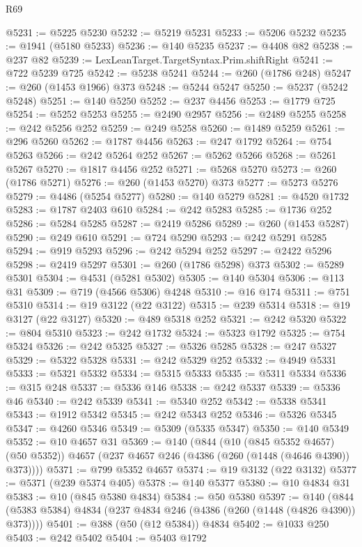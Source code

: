 \begin{lexlean}{R69}
\begin{coremodule}
{@5231 := @5225 @5230
@5232 := @5219 @5231
@5233 := @5206 @5232
@5235 := @1941 (@5180 @5233)
@5236 := @140 @5235
@5237 := @4408 @82
@5238 := @237 @82
@5239 := LexLeanTarget.TargetSyntax.Prim.shiftRight
@5241 := @722 @5239 @725
@5242 := @5238 @5241
@5244 := @260 (@1786 @248)
@5247 := @260 (@1453 @1966) @373
@5248 := @5244 @5247
@5250 := @5237 (@5242 @5248)
@5251 := @140 @5250
@5252 := @237 @4456
@5253 := @1779 @725
@5254 := @5252 @5253
@5255 := @2490 @2957
@5256 := @2489 @5255
@5258 := @242 @5256 @252
@5259 := @249 @5258
@5260 := @1489 @5259
@5261 := @296 @5260
@5262 := @1787 @4456
@5263 := @247 @1792
@5264 := @754 @5263
@5266 := @242 @5264 @252
@5267 := @5262 @5266
@5268 := @5261 @5267
@5270 := @1817 @4456 @252
@5271 := @5268 @5270
@5273 := @260 (@1786 @5271)
@5276 := @260 (@1453 @5270) @373
@5277 := @5273 @5276
@5279 := @4486 (@5254 @5277)
@5280 := @140 @5279
@5281 := @4520 @1732
@5283 := @1787 @2403 @610
@5284 := @242 @5283
@5285 := @1736 @252
@5286 := @5284 @5285
@5287 := @2419 @5286
@5289 := @260 (@1453 @5287)
@5290 := @249 @610
@5291 := @724 @5290
@5293 := @242 @5291 @5285
@5294 := @919 @5293
@5296 := @242 @5294 @252
@5297 := @2422 @5296
@5298 := @2419 @5297
@5301 := @260 (@1786 @5298) @373
@5302 := @5289 @5301
@5304 := @4531 (@5281 @5302)
@5305 := @140 @5304
@5306 := @113 @31
@5309 := @719 (@4566 @5306) @4248
@5310 := @16 @174
@5311 := @751 @5310
@5314 := @19 @3122 (@22 @3122)
@5315 := @239 @5314
@5318 := @19 @3127 (@22 @3127)
@5320 := @489 @5318 @252
@5321 := @242 @5320
@5322 := @804 @5310
@5323 := @242 @1732
@5324 := @5323 @1792
@5325 := @754 @5324
@5326 := @242 @5325
@5327 := @5326 @5285
@5328 := @247 @5327
@5329 := @5322 @5328
@5331 := @242 @5329 @252
@5332 := @4949 @5331
@5333 := @5321 @5332
@5334 := @5315 @5333
@5335 := @5311 @5334
@5336 := @315 @248
@5337 := @5336 @146
@5338 := @242 @5337
@5339 := @5336 @46
@5340 := @242 @5339
@5341 := @5340 @252
@5342 := @5338 @5341
@5343 := @1912 @5342
@5345 := @242 @5343 @252
@5346 := @5326 @5345
@5347 := @4260 @5346
@5349 := @5309 (@5335 @5347)
@5350 := @140 @5349
@5352 := @10 @4657 @31
@5369 := @140
    (@844
      (@10 (@845 @5352 @4657) (@50 @5352))
      @4657
      (@237 @4657 @246 (@4386 (@260 (@1448 (@4646 @4390)) @373))))
@5371 := @799 @5352 @4657
@5374 := @19 @3132 (@22 @3132)
@5377 := @5371 (@239 @5374 @405)
@5378 := @140 @5377
@5380 := @10 @4834 @31
@5383 := @10 (@845 @5380 @4834)
@5384 := @50 @5380
@5397 := @140 (@844 (@5383 @5384) @4834 (@237 @4834 @246 (@4386 (@260 (@1448 (@4826 @4390)) @373))))
@5401 := @388 (@50 (@12 @5384)) @4834
@5402 := @1033 @250
@5403 := @242 @5402
@5404 := @5403 @1792
}
\end{coremodule}
\end{lexlean}
